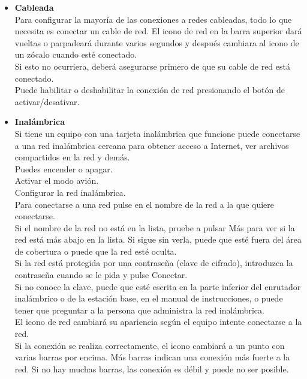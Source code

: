 \documentclass[12pt,letterpaper]{book}
\begin{document}
\begin{itemize}
\item{\bf Cableada}\\
Para configurar la mayoría de las conexiones a redes cableadas, todo lo que necesita es conectar un cable de red. El icono de red en la barra superior dará vueltas o parpadeará durante varios segundos y después cambiara al icono de un zócalo cuando esté conectado.\\
Si esto no ocurriera, deberá asegurarse primero de que su cable de red está conectado.\\

Puede habilitar o deshabilitar la conexión de red presionando el botón de activar/desativar.
\item{\bf Inalámbrica}\\
Si tiene un equipo con una tarjeta inalámbrica que funcione puede conectarse a una red inalámbrica cercana para obtener acceso a Internet, ver archivos compartidos en la red y demás.\\

Puedes encender o apagar.\\
Activar el modo avión.\\
Configurar la red inalámbrica.\\

Para conectarse a una red pulse en el nombre de la red a la que quiere conectarse.\\
Si el nombre de la red no está en la lista, pruebe a pulsar Más para ver si la red está más abajo en la lista. Si sigue sin verla, puede que esté fuera del área de cobertura o puede que la red esté oculta.\\
Si la red está protegida por una contraseña (clave de cifrado), introduzca la contraseña cuando se le pida y pulse Conectar.\\
Si no conoce la clave, puede que esté escrita en la parte inferior del enrutador inalámbrico o de la estación base, en el manual de instrucciones, o puede tener que preguntar a la persona que administra la red inalámbrica.\\
El icono de red cambiará su apariencia según el equipo intente conectarse a la red.\\
Si la conexión se realiza correctamente, el icono cambiará a un punto con varias barras por encima. Más barras indican una conexión más fuerte a la red. Si no hay muchas barras, las conexión es débil y puede no ser posible.\\


\end{itemize}
\end{document}
